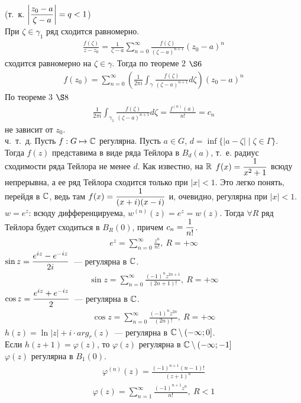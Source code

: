 (т.~к. $\left| \displaystyle \frac{z_0-a}{\zeta-a} \right| = q < 1$)
\\
При $\zeta \in \gamma_1$ ряд сходится равномерно.
\begin{align*}
  \frac{f(\zeta)}{z - z_0} = \frac{1}{\zeta - a} \sum_{n=0}^{\infty}\frac{f(\zeta)}{(\zeta - a)^{n+1}}\left( z_0-a\right)^n
\end{align*}
сходится равномерно на $\zeta \in \gamma$. Тогда по теореме $2$ $\S 6$
\begin{align*}
  f(z_0) = \sum_{n=0}^{\infty}\left( \frac{1}{2\pi i} \int_{\gamma} \frac{f(\zeta)}{(\zeta - a)^{n+1}} d \zeta \right)(z_0-a)^n
\end{align*}
По теореме $3$ $\S 8$
\begin{align*}
  \frac{1}{2 \pi i}\int_{\gamma_1}\frac{f(\zeta)}{(\zeta - a)^{n+1}}d \zeta = \frac{f^{(n)}(a)}{n!} = c_n
\end{align*}
не зависит от $z_0$.
\\
ч.~т.~д.
\corollary
Пусть $f: G \mapsto \mathbb{C}$ регулярна. Пусть $a \in G$, $d = \inf \{\left| a-\zeta
\right| \mid \zeta \in \Gamma\}$.
\\
Тогда $f(z)$ представима в виде ряда Тейлора в $B_d(a)$, т.~е. радиус сходимости
ряда Тейлора не менее $d$.
\note
Как известно, на $\mathbb{R}$ $f(x) = \displaystyle \frac{1}{x^2+1}$ всюду непрерывна, а ее ряд
Тейлора сходится только при $\left| x \right|< 1$. Это легко понять, перейдя в
$\mathbb{C}$, ведь там $f(x) = \displaystyle \frac{1}{(x+i)(x-i)}$ и, очевидно, регулярна при
$\left| x \right| < 1$.
\example
$w = e^z$: всюду дифференцируема, $w^{(n)}(z) = e^z = w(z)$. Тогда $\forall R$
ряд Тейлора будет сходиться в $B_R(0)$, причем $c_n = \displaystyle \frac{1}{n!}$.
\begin{align*}
  e^z = \sum_{n=0}^{\infty} \frac{z^n}{n!}, \ R = +\infty
\end{align*}
\example
$\sin z = \displaystyle \frac{e^{iz} - e^{-iz}}{2i}$~--- регулярна в $\mathbb{C}$.
\begin{align*}
  \sin z = \sum_{n=0}^{\infty} \frac{(-1)^nz^{2n+1}}{(2n+1)!}, \ R = +\infty
\end{align*}
\example
$\cos z = \displaystyle \frac{e^{iz} + e^{-iz}}{2}$~--- регулярна в $\mathbb{C}$.
\begin{align*}
  \cos z = \sum_{n=0}^{\infty} \frac{(-1)^nz^{2n}}{(2n)!}, \ R = +\infty
\end{align*}
\example
$h(z) = \ln \left| z \right| + i \cdot arg_r(z)$~--- регулярна в $\mathbb{C} \setminus
(-\infty; 0]$.
\\
Если $h(z+1) = \varphi(z)$, то $\varphi(z)$ регулярна в $\mathbb{C}\setminus (-\infty; -1]$
\\
$\varphi(z)$ регулярна в $B_1(0)$.
\begin{align*}
  \varphi^{(n)}(z) = \frac{(-1)^{n+1}(n-1)!}{(z+1)^n}
\end{align*}
\begin{align*}
  \varphi(z) = \sum_{n=1}^{\infty}\frac{(-1)^{n+1}z^n}{n!}, \ R < 1
\end{align*}
